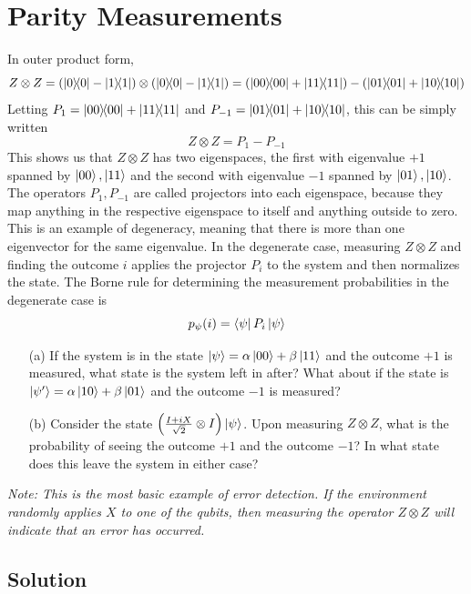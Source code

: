 \documentclass{article}
\begin{document}
{\section*{Parity Measurements}
In outer product form,
$$
Z \otimes Z = (\ketbra{0}{0}-\ketbra{1}{1})\otimes (\ketbra{0}{0}-\ketbra{1}{1}) = (\ketbra{00}{00} + \ketbra{11}{11}) - (\ketbra{01}{01} + \ketbra{10}{10})
$$
Letting $P_{1} = \ketbra{00}{00} + \ketbra{11}{11}$ and $P_{-1} = \ketbra{01}{01} + \ketbra{10}{10}$, this can be simply written
$$
Z \otimes Z = P_{1} - P_{-1}
$$
This shows us that $Z \otimes Z$ has two eigenspaces, the first with eigenvalue $+1$ spanned by $\ket{00}, \ket{11}$ and the second with eigenvalue $-1$ spanned by $\ket{01}, \ket{10}$. The operators $P_1, P_{-1}$ are called projectors into each eigenspace, because they map anything in the respective eigenspace to itself and anything outside to zero. This is an example of degeneracy, meaning that there is more than one eigenvector for the same eigenvalue. In the degenerate case, measuring $Z \otimes Z$ and finding the outcome $i$ applies the projector $P_i$ to the system and then normalizes the state. The Borne rule for determining the measurement probabilities in the degenerate case is
$$
p_\psi(i) = \bra{\psi}P_i\ket{\psi}
$$

\begin{itemize}
\item[(a)] If the system is in the state $\ket{\psi} = \alpha \ket{00} + \beta \ket{11}$ and the outcome $+1$ is measured, what state is the system left in after? What about if the state is $\ket{\psi'} = \alpha \ket{10} + \beta\ket{01}$ and the outcome $-1$ is measured?
\item[(b)] Consider the state $\qty(\frac{I+iX}{\sqrt{2}}\otimes I)\ket{\psi}$. Upon measuring $Z \otimes Z$, what is the probability of seeing the outcome $+1$ and the outcome $-1$? In what state does this leave the system in either case?
\end{itemize}
\textit{Note: This is the most basic example of error detection. If the environment randomly applies $X$ to one of the qubits, then measuring the operator $Z \otimes Z$ will indicate that an error has occurred.}

\subsection*{Solution}

}
\end{document}
